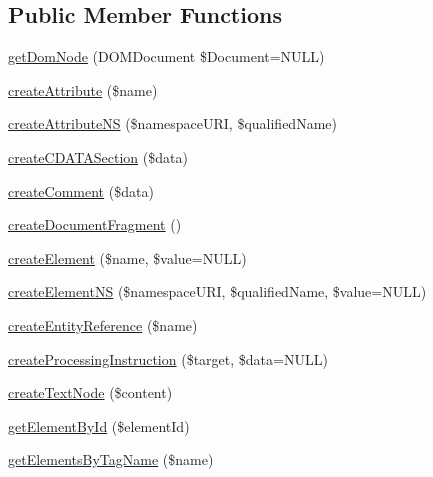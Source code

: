 \subsection*{Public Member Functions}
\begin{DoxyCompactItemize}
\item 
\hyperlink{class_able_polecat___dom___document_abstract_a3241c66cb1cbb7b720be191808876012}{get\+Dom\+Node} (D\+O\+M\+Document \$Document=N\+U\+L\+L)
\item 
\hyperlink{class_able_polecat___dom___document_abstract_a95a8661ef9b03ce670a3b193d459a667}{create\+Attribute} (\$name)
\item 
\hyperlink{class_able_polecat___dom___document_abstract_afc214fc8e5911368cc8e0377a1b2b20e}{create\+Attribute\+N\+S} (\$namespace\+U\+R\+I, \$qualified\+Name)
\item 
\hyperlink{class_able_polecat___dom___document_abstract_a8ee1b077d525d42ff433620320ffa43e}{create\+C\+D\+A\+T\+A\+Section} (\$data)
\item 
\hyperlink{class_able_polecat___dom___document_abstract_a5d7473192c918a49f87139678a9c0698}{create\+Comment} (\$data)
\item 
\hyperlink{class_able_polecat___dom___document_abstract_adee16a21cd2255f11de0a686d058be87}{create\+Document\+Fragment} ()
\item 
\hyperlink{class_able_polecat___dom___document_abstract_ade971bbc47ebf69388e18953164b2e7b}{create\+Element} (\$name, \$value=N\+U\+L\+L)
\item 
\hyperlink{class_able_polecat___dom___document_abstract_a603176eca3dd9fe0144195dd929d5084}{create\+Element\+N\+S} (\$namespace\+U\+R\+I, \$qualified\+Name, \$value=N\+U\+L\+L)
\item 
\hyperlink{class_able_polecat___dom___document_abstract_a9ebf6ac8ffb82d039f1bcd6c2e0c4ff6}{create\+Entity\+Reference} (\$name)
\item 
\hyperlink{class_able_polecat___dom___document_abstract_ad3fb9fe5a4f1d33bc246334d84cb83b4}{create\+Processing\+Instruction} (\$target, \$data=N\+U\+L\+L)
\item 
\hyperlink{class_able_polecat___dom___document_abstract_a9b040c658a1284d7b1931ea9f7cb57aa}{create\+Text\+Node} (\$content)
\item 
\hyperlink{class_able_polecat___dom___document_abstract_a9248e8c174d03acd54cb8e7fc7b966fb}{get\+Element\+By\+Id} (\$element\+Id)
\item 
\hyperlink{class_able_polecat___dom___document_abstract_a79196ad8273cd289455fc6781944d1f3}{get\+Elements\+By\+Tag\+Name} (\$name)

\end{DoxyCompactItemize}
